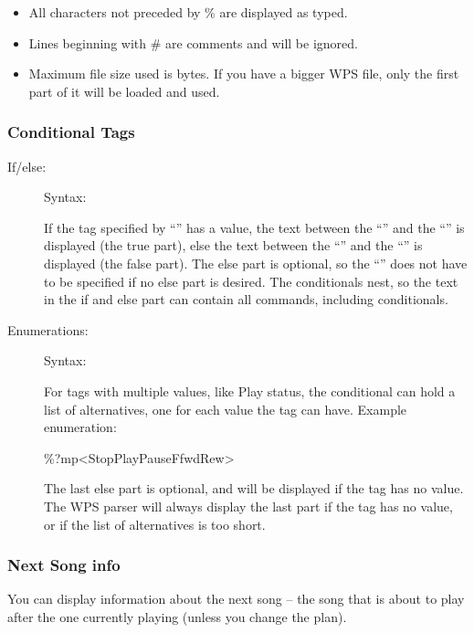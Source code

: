 \begin{itemize}
  \item All characters not preceded by \% are displayed as typed.
  \item Lines beginning with \# are comments and will be ignored.
  \item Maximum file size used is 
       bytes.
      If you have a bigger WPS file, only the first part of it will be 
      loaded and used.
\end{itemize}

\subsubsection{Conditional Tags}

\begin{description}
\item[If/else: ]
Syntax: 

If the tag specified by ``'' has a value, the text between the 
``\config{{\textless}}'' and the ``\config{{\textbar}}'' is displayed (the true
part), else the text between the ``\config{{\textbar}}'' and the 
``\config{{\textgreater}}'' is displayed (the false part).
The else part is optional, so the ``\config{{\textbar}}'' does not have to be 
specified if no else part is desired. The conditionals nest, so the text in the
if and else part can contain all \config{\%} commands, including conditionals.

\item[Enumerations: ]
Syntax: 

For tags with multiple values, like Play status, the conditional can hold a 
list of alternatives, one for each value the tag can have.
Example enumeration: 
\begin{example}
    \%?mp{\textless}Stop{\textbar}Play{\textbar}Pause{\textbar}Ffwd{\textbar}Rew{\textgreater}
\end{example}

The last else part is optional, and will be displayed if the tag has no value. 
The WPS parser will always display the last part if the tag has no value, or if
the list of alternatives is too short.
\end{description}

\subsubsection{Next Song info}
You can display information about the next song -- the song that is
about to play after the one currently playing (unless you change the
plan).


